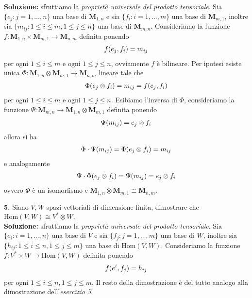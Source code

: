 \documentclass{article}
\begin{document}
\textbf{Soluzione:} sfruttiamo la \textit{proprietà universale del prodotto tensoriale}. Sia $\{ e_j : j = 1, \dots, n \}$ una base di $\mathbf{M}_{1, n}$ e sia $\{ f_i : i = 1, \dots, m \}$ una base di $\mathbf{M}_{m, 1}$, inoltre sia $\{ m_{ij} : 1 \leq i \leq m, 1 \leq j \leq n \}$ una base di $\mathbf{M}_{m, n}$. Consideriamo la funzione $f : \mathbf{M}_{1, n} \times \mathbf{M}_{m, 1} \longrightarrow \mathbf{M}_{n, m}$ definita ponendo
\begin{gather}
    f(e_j, f_i) = m_{ij} \notag
\end{gather}
per ogni $1 \leq i \leq m$ e ogni $1 \leq j \leq n$, ovviamente $f$ è bilineare. Per ipotesi esiste unica $\Phi : \mathbf{M}_{1, n} \otimes \mathbf{M}_{m, 1} \longrightarrow \mathbf{M}_{n, m}$ lineare tale che
\begin{gather}
    \Phi(e_j \otimes f_i) = m_{ij} = f(e_j, f_i) \notag
\end{gather}
per ogni $1 \leq i \leq m$ e ogni $1 \leq j \leq n$. Esibiamo l'inversa di $\Phi$, consideriamo la funzione $\Psi : \mathbf{M}_{m, n} \longrightarrow \mathbf{M}_{1, n} \otimes \mathbf{M}_{m, 1}$ definita ponendo
\begin{gather}
    \Psi (m_{ij}) = e_j \otimes f_i \notag
\end{gather}
allora si ha
\begin{gather}
    \Phi \cdot \Psi (m_{ij}) = \Phi(e_j \otimes f_i) = m_{ij} \notag
\end{gather}
e analogamente
\begin{gather}
    \Psi \cdot \Phi(e_j \otimes f_i) = \Psi(m_{ij}) = e_j \otimes f_i \notag
\end{gather}
ovvero $\Phi$ è un isomorfismo e $\mathbf{M}_{1, n} \otimes \mathbf{M}_{m, 1} \cong \mathbf{M}_{n, m}$.

\newpage
\textbf{5.} Siano $V, W$ spazi vettoriali di dimensione finita, dimostrare che $\mathrm{Hom}(V, W) \cong V^* \otimes W$. \\

\textbf{Soluzione:} sfruttiamo la \textit{proprietà universale del prodotto tensoriale}. Sia $\{ e_i : i = 1, \dots, n \}$ una base di $V$ e sia $\{ f_j : j = 1, \dots, m \}$ una base di $W$, inoltre sia $\{ h_{ij} : 1 \leq i \leq n, 1 \leq j \leq m \}$ una base di $\mathrm{Hom}(V, W)$. Consideriamo la funzione $f : V^* \times W \longrightarrow \mathrm{Hom}(V, W)$ definita ponendo
\begin{gather}
    f(e^i, f_j) = h_{ij} \notag
\end{gather}
per ogni $1 \leq i \leq n, 1 \leq j \leq m$. Il resto della dimostrazione è del tutto analogo alla dimostrazione dell'\textit{esercizio 5}.
\end{document}
